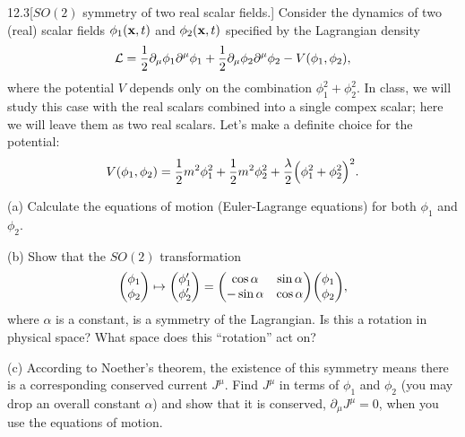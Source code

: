 \documentclass[12pt]{article}
\begin{document}
\newpage
\begin{problem}{12.3}[$SO(2)$ symmetry of two real scalar fields.]
Consider the dynamics of two (real) scalar fields $\phi_1(\vb{x},t)$ and
$\phi_2(\vb{x},t)$ specified by the Lagrangian density
\begin{equation}
    \mathcal{L}=\frac12\partial_\mu\phi_1\partial^\mu\phi_1+\frac12\partial_\mu\phi_2\partial^\mu\phi_2-V(\phi_1,\phi_2), 
\end{equation}
where the potential $V$ depends only on the combination $\phi_1^2+\phi_2^2$. In
class, we will study this case with the real scalars combined into a single
compex scalar; here we will leave them as two real scalars. Let's make a
definite choice for the potential:
\begin{equation}
    V(\phi_1,\phi_2)=\frac12m^2\phi_1^2+\frac12m^2\phi_2^2+\frac{\lambda}2\qty(\phi_1^2+\phi_2^2)^2. 
\end{equation}

(a) Calculate the equations of motion (Euler-Lagrange equations) for both
$\phi_1$ and $\phi_2$.

(b) Show that the $SO(2)$ transformation
\begin{equation}
    \mqty(\phi_1\\\phi_2)\mapsto\mqty(\phi_1'\\\phi_2')=\mqty(\cos\alpha&\sin\alpha\\-\sin\alpha&\cos\alpha)\mqty(\phi_1\\\phi_2), 
\end{equation}
where $\alpha$ is a constant, is a symmetry of the Lagrangian. Is this a
rotation in physical space? What space does this ``rotation'' act on?

(c) According to Noether's theorem, the existence of this symmetry means there
is a corresponding conserved current $J^\mu$. Find $J^\mu$ in terms of $\phi_1$
and $\phi_2$ (you may drop an overall constant $\alpha$) and show that it is
conserved, $\partial_\mu J^\mu=0$, when you use the equations of motion.
\begin{solution}
\end{solution}
\end{problem}
\newpage
\end{document}
